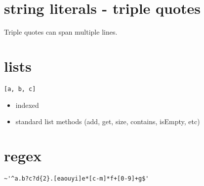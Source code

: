 \documentclass{report}
\begin{document}
\section{string literals - triple quotes}
Triple quotes can span multiple lines.


\section{lists}
\begin{verbatim}
[a, b, c]
\end{verbatim}
\begin{itemize}
  \item indexed
  \item standard list methods (add, get, size, contains, isEmpty, etc)
\end{itemize}


\section{regex}
\begin{verbatim}
~'^a.b?c?d{2}.[eaouyi]e*[c-m]*f+[0-9]+g$'
\end{verbatim}
\end{document}
